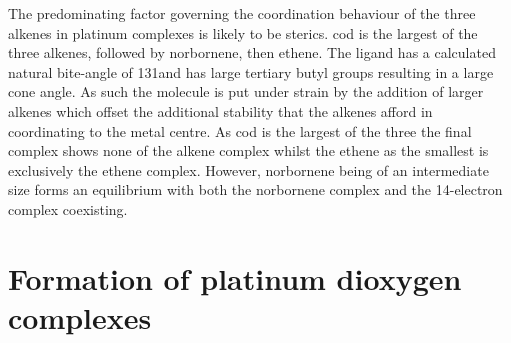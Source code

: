 
The predominating factor governing the coordination behaviour of the three alkenes in \tButhixantphos{} platinum complexes is likely to be sterics.  \Gls{cod} is the largest of the three alkenes, followed by norbornene, then ethene.  The \tButhixantphos{}ligand has a calculated natural bite-angle of 131\degrees and has large tertiary butyl groups resulting in a large cone angle.  As such the molecule is put under strain by the addition of larger alkenes which offset the additional stability that the alkenes afford in coordinating to the metal centre.  As \gls{cod} is the largest of the three the final complex shows none of the alkene complex whilst the ethene as the smallest is exclusively the ethene complex.  However, norbornene being of an intermediate size forms an equilibrium with both the norbornene complex and the 14-electron complex coexisting.  

 
\section{Formation of platinum dioxygen complexes}
\label{section:PtO2}

